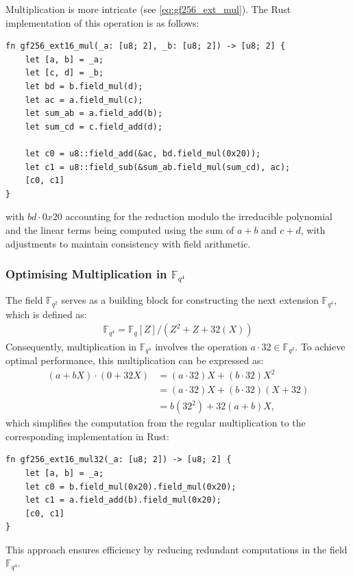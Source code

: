 \documentclass[11pt]{report}
\theoremstyle{definition}
\theoremstyle{plain}
\begin{document}
Multiplication is more intricate (see \autoref{eq:gf256_ext_mul}). The Rust implementation of this operation is as follows:
\begin{verbatim}
fn gf256_ext16_mul(_a: [u8; 2], _b: [u8; 2]) -> [u8; 2] {
    let [a, b] = _a;
    let [c, d] = _b;
    let bd = b.field_mul(d);
    let ac = a.field_mul(c);
    let sum_ab = a.field_add(b);
    let sum_cd = c.field_add(d);

    let c0 = u8::field_add(&ac, bd.field_mul(0x20));
    let c1 = u8::field_sub(&sum_ab.field_mul(sum_cd), ac);
    [c0, c1]
}
\end{verbatim}
with $bd \cdot 0x20$ accounting for the reduction modulo the irreducible polynomial and the linear terms being computed using the sum of $a+b$ and $c+d$, with adjustments to maintain consistency with field arithmetic.

\subsubsection*{Optimising Multiplication in $\mathbb{F}_{q^4}$}

The field $\mathbb{F}_{q^2}$ serves as a building block for constructing the next extension $\mathbb{F}_{q^4}$, which is defined as:
\begin{align}
  \mathbb{F}_{q^4} = \mathbb{F}_q[Z] / (Z^2 + Z + 32(X))\label{eq:fq4}
\end{align}
Consequently, multiplication in $\mathbb{F}_{q^4}$ involves the operation $a \cdot 32 \in \mathbb{F}_{q^2}$.
To achieve optimal performance, this multiplication can be expressed as:
\begin{align*}
  (a + bX) \cdot (0 + 32X) & = (a \cdot 32)X + (b \cdot 32)X^2      \\
                           & = (a \cdot 32)X + (b \cdot 32)(X + 32) \\
                           & = b(32^2) + 32(a + b)X,
\end{align*}
which simplifies the computation from the regular multiplication to the corresponding implementation in Rust:
\begin{verbatim}
fn gf256_ext16_mul32(_a: [u8; 2]) -> [u8; 2] {
    let [a, b] = _a;
    let c0 = b.field_mul(0x20).field_mul(0x20);
    let c1 = a.field_add(b).field_mul(0x20);
    [c0, c1]
}
\end{verbatim}

This approach ensures efficiency by reducing redundant computations in the field $\mathbb{F}_{q^4}$.
\end{document}
